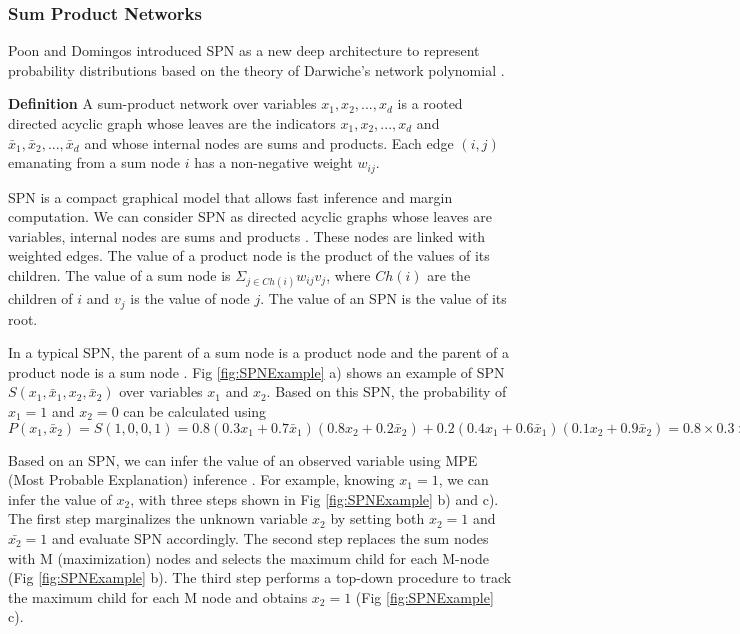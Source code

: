 \documentclass[journal]{IEEEtran}
\begin{document}
\subsubsection{Sum Product Networks}

Poon and Domingos \cite{poon2011SPNIntroduce} introduced SPN as a new deep architecture to represent probability distributions  based on the theory of Darwiche's network polynomial \cite{Darwiche:2003:DAI:765568.765570}. 

\textbf{Definition} \cite{poon2011SPNIntroduce} A sum-product network over variables $ x_1,x_2,...,x_d $ is a rooted directed acyclic graph whose leaves are the indicators $ x_1,x_2,...,x_d $ and $ \bar{x}_1,\bar{x}_2,...,\bar{x}_d $ and whose internal nodes are sums and products. Each edge $ (i,j) $ emanating from a sum node $ i $ has a non-negative weight $ w_{ij} $. 




SPN is a compact graphical model that allows fast inference and margin computation. We can consider SPN as directed acyclic graphs whose leaves are variables, internal nodes are sums and products \cite{poon2011SPNIntroduce}. These nodes are linked with weighted edges. 
The value of a product node is the product of the values of its children. The value of a sum node is $ \Sigma_{j\in Ch(i)}w_{ij}v_j $, where $ Ch(i) $ are the children of $ i $ and $ v_j $ is the value of node $ j $. The value of an SPN is the value of its root.





In a typical SPN, the parent of a sum node is a product node and the parent of a product node is a sum node \cite{SPNWangXiaogangFacial,poon2011SPNIntroduce}. Fig \ref{fig:SPNExample} a) shows an example of SPN $ S(x_1,\bar{x}_1,x_2,\bar{x}_2) $ over variables $ x_1 $ and $ x_2 $. Based on this SPN, the probability of $ x_1=1 $ and $ x_2=0 $ can be calculated using $ P(x_1,\bar{x}_2)=S(1,0,0,1)=0.8(0.3x_1+0.7\bar{x}_1)(0.8x_2+0.2\bar{x}_2)+0.2(0.4x_1+0.6\bar{x}_1)(0.1x_2+0.9\bar{x}_2)=0.8\times0.3\times0.2+0.2\times0.4\times0.9=0.12 $

Based on an SPN, we can infer the value of an observed variable using MPE (Most Probable Explanation) inference \cite{Darwiche:2003:DAI:765568.765570}. For example, knowing $ x_1=1 $, we can infer the value of $ x_2 $, with three steps shown in Fig \ref{fig:SPNExample} b) and c). The first step marginalizes the unknown variable $ x_2 $ by setting both $ x_2=1 $ and $ \bar{x_2}=1 $ and evaluate SPN accordingly. The second step replaces the sum nodes with M (maximization) nodes and selects the maximum child for each M-node (Fig \ref{fig:SPNExample} b). The third step performs a top-down procedure to track the maximum child for each M node and obtains $ x_2=1 $ (Fig \ref{fig:SPNExample} c).
\end{document}
